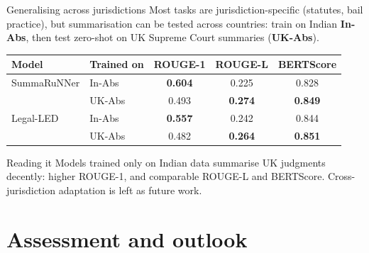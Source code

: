\documentclass[aspectratio=169,11pt]{beamer}
\begin{document}
\begin{frame}{Generalising across jurisdictions}
  \small
  Most tasks are jurisdiction-specific (statutes, bail practice), but summarisation can be tested across countries: train on Indian \textbf{In-Abs}, then test zero-shot on UK Supreme Court summaries (\textbf{UK-Abs}).
  \vspace{2mm}

  \centering
  \footnotesize
  \begin{tabular}{@{}llccc@{}}
    \toprule
    Model & Trained on & ROUGE-1 & ROUGE-L & BERTScore\\
    \midrule
    SummaRuNNer & In-Abs & \textbf{0.604} & 0.225 & 0.828\\
    & UK-Abs & 0.493 & \textbf{0.274} & \textbf{0.849}\\
    Legal-LED & In-Abs & \textbf{0.557} & 0.242 & 0.844\\
    & UK-Abs & 0.482 & \textbf{0.264} & \textbf{0.851}\\
    \bottomrule
  \end{tabular}
  \vspace{2mm}

  \raggedright
  \begin{exampleblock}{Reading it}
    \small
    Models trained only on Indian data summarise UK judgments decently: higher ROUGE-1, and comparable ROUGE-L and BERTScore. Cross-jurisdiction adaptation is left as future work.
  \end{exampleblock}
\end{frame}

\section{Assessment and outlook}
\end{document}
